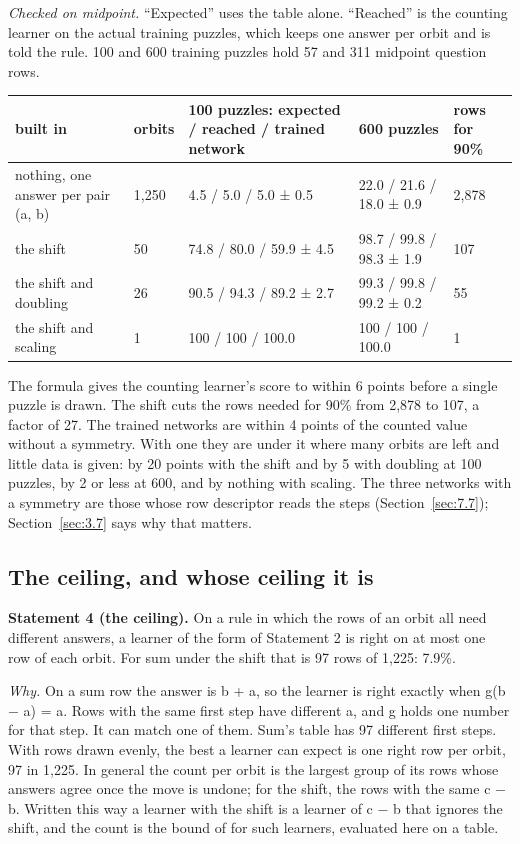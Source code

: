 \emph{Checked on midpoint.} ``Expected'' uses the table alone. ``Reached'' is the counting learner on the actual training puzzles, which keeps one answer per orbit and is told the rule. 100 and 600 training puzzles hold 57 and 311 midpoint question rows.

\begin{center}\small
\begin{tabularx}{\linewidth}{@{}YlYYl@{}}
\toprule
built in & orbits & 100 puzzles: expected / reached / trained network & 600 puzzles & rows for 90\% \\
\midrule
nothing, one answer per pair (a, b) & 1,250 & 4.5 / 5.0 / 5.0 ± 0.5 & 22.0 / 21.6 / 18.0 ± 0.9 & 2,878 \\
the shift & 50 & 74.8 / 80.0 / 59.9 ± 4.5 & 98.7 / 99.8 / 98.3 ± 1.9 & 107 \\
the shift and doubling & 26 & 90.5 / 94.3 / 89.2 ± 2.7 & 99.3 / 99.8 / 99.2 ± 0.2 & 55 \\
the shift and scaling & 1 & 100 / 100 / 100.0 & 100 / 100 / 100.0 & 1 \\
\bottomrule
\end{tabularx}
\end{center}

The formula gives the counting learner's score to within 6 points before a single puzzle is drawn. The shift cuts the rows needed for 90\% from 2,878 to 107, a factor of 27. The trained networks are within 4 points of the counted value without a symmetry. With one they are under it where many orbits are left and little data is given: by 20 points with the shift and by 5 with doubling at 100 puzzles, by 2 or less at 600, and by nothing with scaling. The three networks with a symmetry are those whose row descriptor reads the steps (Section~\ref{sec:7.7}); Section~\ref{sec:3.7} says why that matters.

\subsection{The ceiling, and whose ceiling it is}\label{sec:3.6.3}

\textbf{Statement 4 (the ceiling).} On a rule in which the rows of an orbit all need different answers, a learner of the form of Statement 2 is right on at most one row of each orbit. For sum under the shift that is 97 rows of 1,225: 7.9\%.

\emph{Why.} On a sum row the answer is b + a, so the learner is right exactly when g(b − a) = a. Rows with the same first step have different a, and g holds one number for that step. It can match one of them. Sum's table has 97 different first steps. With rows drawn evenly, the best a learner can expect is one right row per orbit, 97 in 1,225. In general the count per orbit is the largest group of its rows whose answers agree once the move is undone; for the shift, the rows with the same c − b. Written this way a learner with the shift is a learner of c − b that ignores the shift, and the count is the bound of \citet[Theorem 4.3]{wang2023general} for such learners, evaluated here on a table.

